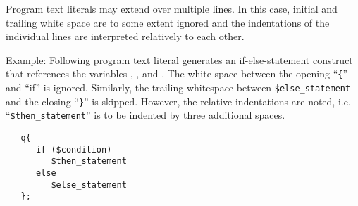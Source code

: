 Program text literals may extend over multiple lines. In this
case, initial and trailing white space are to some extent ignored
and the indentations of the individual lines are interpreted
relatively to each other.

Example: Following program text literal generates an
if-else-statement construct that references the variables
, , and .
The white space between the opening ``\lstinline!{!''
and ``if'' is ignored. Similarly, the trailing whitespace between
\lstinline!$else_statement! %
and the closing
``\lstinline!}!''
is skipped.
However, the relative indentations are noted, i.e.
``\lstinline!$then_statement!'' %
is to be indented by three additional spaces.

\begin{lstlisting}
   q{
      if ($condition)
         $then_statement
      else
         $else_statement
   };
\end{lstlisting}

\endinput
